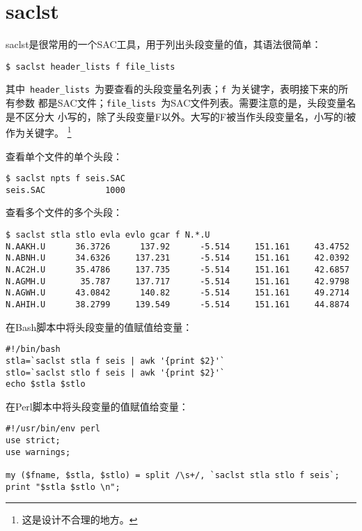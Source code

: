 \section{saclst}
\label{sec:saclst}

saclst是很常用的一个SAC工具，用于列出头段变量的值，其语法很简单：
\begin{lstlisting}[style=Shell]
$ saclst header_lists f file_lists
\end{lstlisting}
其中~\lstinline{header_lists}~为要查看的头段变量名列表；\lstinline{f}~为关键字，表明接下来的所有参数
都是SAC文件；\lstinline{file_lists}~为SAC文件列表。需要注意的是，头段变量名是不区分大
小写的，除了头段变量F以外。大写的F被当作头段变量名，小写的f被作为关键字。
\footnote{这是设计不合理的地方。}

查看单个文件的单个头段：
\begin{lstlisting}[style=Shell]
$ saclst npts f seis.SAC
seis.SAC            1000
\end{lstlisting}

查看多个文件的多个头段：
\begin{lstlisting}[style=Shell]
$ saclst stla stlo evla evlo gcar f N.*.U
N.AAKH.U      36.3726      137.92      -5.514     151.161     43.4752
N.ABNH.U      34.6326     137.231      -5.514     151.161     42.0392
N.AC2H.U      35.4786     137.735      -5.514     151.161     42.6857
N.AGMH.U       35.787     137.717      -5.514     151.161     42.9798
N.AGWH.U      43.0842      140.82      -5.514     151.161     49.2714
N.AHIH.U      38.2799     139.549      -5.514     151.161     44.8874
\end{lstlisting}

在Bash脚本中将头段变量的值赋值给变量：
\begin{lstlisting}[style=Bash]
#!/bin/bash
stla=`saclst stla f seis | awk '{print $2}'`
stlo=`saclst stlo f seis | awk '{print $2}'`
echo $stla $stlo
\end{lstlisting}

在Perl脚本中将头段变量的值赋值给变量：
\begin{lstlisting}[style=Perl]
#!/usr/bin/env perl 
use strict;
use warnings;

my ($fname, $stla, $stlo) = split /\s+/, `saclst stla stlo f seis`;
print "$stla $stlo \n";
\end{lstlisting}
